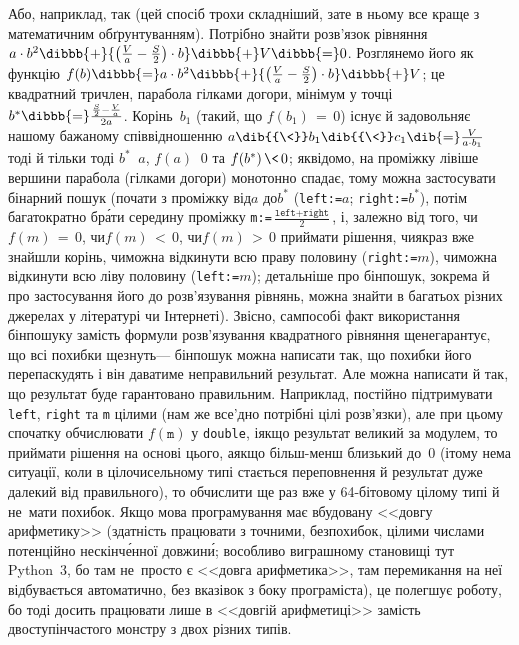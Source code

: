 Або, наприклад, так (цей спосіб трохи складніший, зате в ньому все краще з математичним обґрунтуванням).
Потрібно знайти розв'язок рівняння $a\cdot b^2 \dibbb{{+}} {\bigl(\frac{V}{a}-\frac{S}{2}\bigr)\cdot b} \dibbb{{+}} V \dibbb{{=}} 0$. Розглянемо його як функцію $f(b)\dibbb{{=}}a\cdot b^2 \dibbb{{+}} {\bigl(\frac{V}{a}-\frac{S}{2}\bigr)\cdot b} \dibbb{{+}} V$; це квадратний тричлен, парабола гілками догори, мінімум у точці $b^{*}\dibbb{{=}}\frac{\frac{S}{2}-\frac{V}{a}}{2a}$. Корінь~$b_1$ (такий, що ${f(b_1)\,{=}\,0}$) існує й задовольняє нашому бажаному співвідношенню $a\dib{{\<}}b_1\dib{{\<}}c_1\dib{{=}}\frac{V}{a\cdot{}b_1}$ тоді й тільки тоді ${b^{*}\,{\>}\,a}$, ${f(a)\,{\>}\,0}$ та ${f(b^{*})\,{\<}\,0}$; як\nolinebreak[3] відомо, на проміжку лівіше вершини парабола (гілками догори) монотонно спадає, тому можна застосувати бінарний пошук (почати з проміжку від\nolinebreak[2] $a$ до\nolinebreak[3] $b^{*}$ (\texttt{left:=}$a$; \texttt{right:=}$b^{*}$), потім багатократно бр\'{а}ти середину проміжку \texttt{m:=}$\frac{\texttt{left}+\texttt{right}}{2}$, і, залежно від того, 
чи\nolinebreak[3] ${f(m)\,{=}\,0}$,
чи\nolinebreak[3] ${f(m)\,{<}\,0}$, 
чи\nolinebreak[3] ${f(m)\,{>}\,0}$
приймати рішення, 
чи\nolinebreak[2] якраз вже знайшли корінь, 
чи\nolinebreak[3] можна відкинути всю праву половину (\texttt{right:=}$m$), 
чи\nolinebreak[3] можна відкинути всю ліву половину (\texttt{left:=}$m$);  
детальніше про бінпошук, зокрема й про застосування його до розв'язування рівнянь, можна знайти в багатьох різних джерелах у літературі чи Інтернеті).
Звісно, сам\nolinebreak[3] по\nolinebreak[3] собі факт використання бінпошуку замість формули розв'язування квадратного рівняння ще\nolinebreak[3] не\nolinebreak[3] гарантує, що всі похибки щезнуть\nolinebreak[3] --- бінпошук можна написати так, що похибки його перепаскудять і він даватиме неправильний результат. Але можна написати й так, що результат буде гарантовано правильним. Наприклад, постійно підтримувати 
\texttt{left},
\texttt{right} та
\texttt{m} цілими (нам же все'дно потрібні цілі розв'язки), але при цьому 
спочатку обчислювати $f(\texttt{m})$ у \texttt{double}, і\nolinebreak[3] якщо результат великий за модулем, то приймати рішення на основі цього, а\nolinebreak[3] якщо більш-менш близький до~0 (і\nolinebreak[3] тому нема ситуації, коли в цілочисельному типі стається переповнення й результат дуже далекий від правильного), то обчислити ще раз вже у 64-бітовому цілому типі й не~мати похибок. 
Якщо мова програмування має вбудовану <<довгу арифметику>> (здатність працювати з точними, без\nolinebreak[3] похибок, цілими числами потенційно нескінч\'{е}нної довжин\'{и}; в\nolinebreak[3] особливо виграшному становищі тут Python~3, бо там не~просто є <<довга арифметика>>, там перемикання на неї відбувається автоматично, без вказівок з боку програміста), це полегшує роботу, бо тоді досить працювати лише в <<довгій арифметиці>> замість двоступінчастого монстру з двох різних типів.


